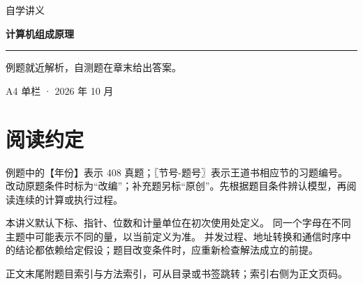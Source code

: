 
\newcommand{\BookTitle}{计算机组成原理}

\begin{titlepage}
\thispagestyle{empty}
\vspace*{25mm}
{\sffamily\color{accent}\fontsize{16}{24} 自学讲义}\par
\vspace{15mm}
{\sffamily\bfseries\color{ink}\fontsize{32}{45}\selectfont 计算机组成原理}\par
\vspace{15mm}
\noindent\rule{\textwidth}{0.5pt}\par
\vspace{5mm}
\noindent 例题就近解析，自测题在章末给出答案。\par
\vfill
\noindent A4 单栏 · 2026 年 10 月\par
\end{titlepage}
\tableofcontents
\clearpage
{}\chapter*{阅读约定}
例题中的【年份】表示 408 真题；〖节号-题号〗表示王道书相应节的习题编号。
改动原题条件时标为“改编”；补充题另标“原创”。先根据题目条件辨认模型，再阅读连续的计算或执行过程。

本讲义默认下标、指针、位数和计量单位在初次使用处定义。
同一个字母在不同主题中可能表示不同的量，以当前定义为准。
并发过程、地址转换和通信时序中的结论都依赖给定假设；题目改变条件时，应重新检查解法成立的前提。

正文末尾附题目索引与方法索引，可从目录或书签跳转；索引右侧为正文页码。
\clearpage
{}
\setcounter{chapter}{0}



